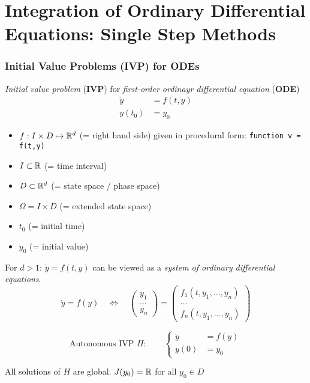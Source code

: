 \part{Integration of Ordinary Differential Equations: Single Step Methods}
\section{Initial Value Problems (IVP) for ODEs}
 \emph{Initial value problem} (\textbf{IVP}) for \emph{first-order ordinayr differential equation} (\textbf{ODE})
	\begin{align*}
	 \dot y &= f(t,y)\\
	 y(t_0) &= y_0
	\end{align*}
\begin{itemize}
 \item $f:I\times D \mapsto \mathbb{R}^d$ (= right hand side) given in procedural form: \verb|function v = f(t,y)|
 \item $I \subset \mathbb{R}$ (= time interval)
 \item $D \subset \mathbb{R}^d$ (= state space / phase space)
 \item $\Omega = I \times D$ (= extended state space)
 \item $t_0$ (= initial time)
 \item $y_0$ (= initial value)
\end{itemize}

	For $d>1$: $\dot y = f(t,y)$ can be viewed as a \emph{system of ordinary differential equations}.
	\[
	 \dot y = f(y) \quad \Longleftrightarrow \quad \begin{pmatrix}
	                                            y_1\\
	                                            \hdots\\
	                                            y_n
	                                           \end{pmatrix} =
	                                           \begin{pmatrix}
	                                            f_1(t,y_1, \ldots,y_n)\\
	                                            \hdots\\
	                                            f_n(t,y_1,\ldots, y_n)
	                                           \end{pmatrix}
	\]
	
	\[
	\text{Autonomous IVP }H: \qquad \left\{ \begin{array}{ll}
	                              \dot y &= f(y)\\
	                              y(0) &= y_0
	                             \end{array} \right.
	\]
	\begin{fmerke}
	 All solutions of $H$ are global. $J(y_0) = \mathbb{R}$ for all $y_0 \in D$
	\end{fmerke}

